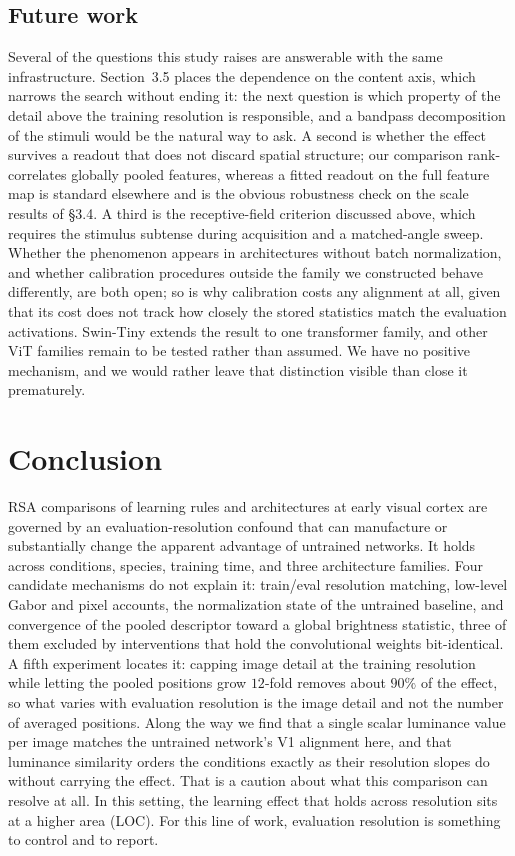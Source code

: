 \documentclass[10pt,twocolumn]{article}
\begin{document}
\subsection{Future work}

Several of the questions this study raises are answerable with the same infrastructure. Section~3.5 places the dependence on the content axis, which narrows the search without ending it: the next question is which property of the detail above the training resolution is responsible, and a bandpass decomposition of the stimuli would be the natural way to ask. A second is whether the effect survives a readout that does not discard spatial structure; our comparison rank-correlates globally pooled features, whereas a fitted readout on the full feature map is standard elsewhere and is the obvious robustness check on the scale results of \S3.4. A third is the receptive-field criterion discussed above, which requires the stimulus subtense during acquisition and a matched-angle sweep. Whether the phenomenon appears in architectures without batch normalization, and whether calibration procedures outside the family we constructed behave differently, are both open; so is why calibration costs any alignment at all, given that its cost does not track how closely the stored statistics match the evaluation activations. Swin-Tiny extends the result to one transformer family, and other ViT families remain to be tested rather than assumed. We have no positive mechanism, and we would rather leave that distinction visible than close it prematurely.

\section{Conclusion}

RSA comparisons of learning rules and architectures at early visual cortex are governed by an evaluation-resolution confound that can manufacture or substantially change the apparent advantage of untrained networks. It holds across conditions, species, training time, and three architecture families. Four candidate mechanisms do not explain it: train/eval resolution matching, low-level Gabor and pixel accounts, the normalization state of the untrained baseline, and convergence of the pooled descriptor toward a global brightness statistic, three of them excluded by interventions that hold the convolutional weights bit-identical. A fifth experiment locates it: capping image detail at the training resolution while letting the pooled positions grow $12$-fold removes about $90\%$ of the effect, so what varies with evaluation resolution is the image detail and not the number of averaged positions. Along the way we find that a single scalar luminance value per image matches the untrained network's V1 alignment here, and that luminance similarity orders the conditions exactly as their resolution slopes do without carrying the effect. That is a caution about what this comparison can resolve at all. In this setting, the learning effect that holds across resolution sits at a higher area (LOC). For this line of work, evaluation resolution is something to control and to report.
\end{document}
